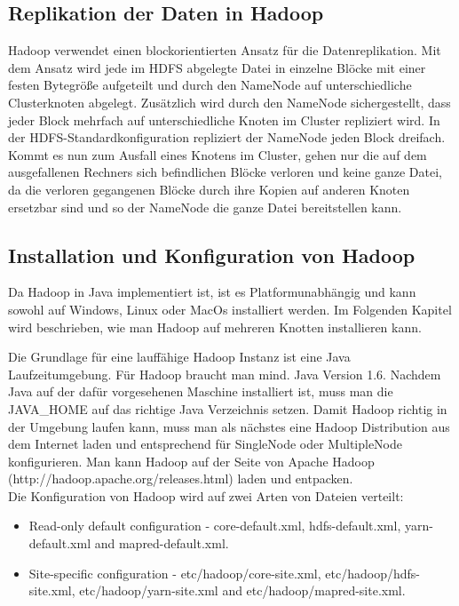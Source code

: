 \subsection{Replikation der Daten in Hadoop}
Hadoop verwendet einen blockorientierten Ansatz für die Datenreplikation. Mit dem Ansatz wird jede im HDFS abgelegte Datei in einzelne Blöcke mit einer festen Bytegröße aufgeteilt und durch den NameNode auf unterschiedliche Clusterknoten abgelegt. Zusätzlich wird durch den NameNode sichergestellt, dass jeder Block mehrfach auf unterschiedliche Knoten im Cluster repliziert wird.
In der HDFS-Standardkonfiguration repliziert der NameNode jeden Block dreifach. Kommt es nun zum Ausfall eines Knotens im Cluster, gehen nur die auf dem ausgefallenen Rechners sich befindlichen Blöcke verloren und keine ganze Datei, da die verloren gegangenen Blöcke durch ihre Kopien auf anderen Knoten ersetzbar sind und so der NameNode die ganze Datei bereitstellen kann.
\cite{replikation}

\subsection{Installation und Konfiguration von Hadoop}
Da Hadoop in Java implementiert ist, ist es Platformunabhängig und kann sowohl auf Windows, Linux oder MacOs installiert werden.
Im Folgenden Kapitel wird beschrieben, wie man Hadoop auf mehreren Knotten installieren kann. 

Die Grundlage für eine lauffähige Hadoop Instanz ist eine Java Laufzeitumgebung. Für Hadoop braucht man mind. Java Version 1.6.
Nachdem Java auf der dafür vorgesehenen Maschine installiert ist, muss man die JAVA_HOME auf das richtige Java Verzeichnis setzen.
Damit Hadoop richtig in der Umgebung laufen kann, muss man als nächstes eine Hadoop Distribution aus dem Internet laden und entsprechend für SingleNode oder MultipleNode konfigurieren.
Man kann Hadoop auf der Seite von Apache Hadoop  (http://hadoop.apache.org/releases.html) laden und entpacken.\\
Die Konfiguration von Hadoop wird auf zwei Arten von Dateien verteilt:
\begin{itemize}
\item Read-only default configuration - core-default.xml, hdfs-default.xml, yarn-default.xml and mapred-default.xml.
\item Site-specific configuration - etc/hadoop/core-site.xml, etc/hadoop/hdfs-site.xml, etc/hadoop/yarn-site.xml and etc/hadoop/mapred-site.xml.
\end{itemize}
\cite{hadoopConfiguration}

